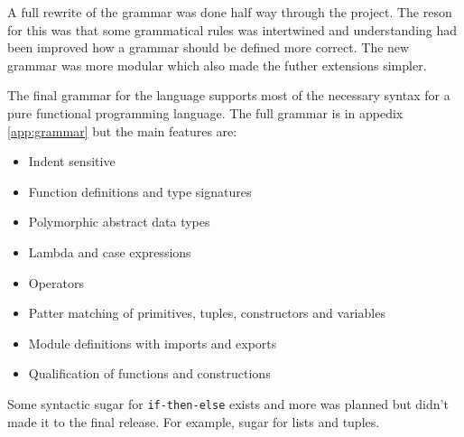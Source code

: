 A full rewrite of the grammar was done half way through the project. The reson for this was that some grammatical rules was intertwined and understanding had been improved how a grammar should be defined more correct. The new grammar was more modular which also made the futher extensions simpler.

The final grammar for the language supports most of the necessary syntax for a pure functional programming language.  The full grammar is in appedix \ref{app:grammar} but the main features are:

\begin{itemize}
  \item Indent sensitive
  \item Function definitions and type signatures
  \item Polymorphic abstract data types
  \item Lambda and case expressions
  \item Operators
  \item Patter matching of primitives, tuples, constructors and variables
  \item Module definitions with imports and exports
  \item Qualification of functions and constructions
\end{itemize}


Some syntactic sugar for \texttt{if-then-else} exists and more was planned but didn't made it to the final release. For example, sugar for lists and tuples.
